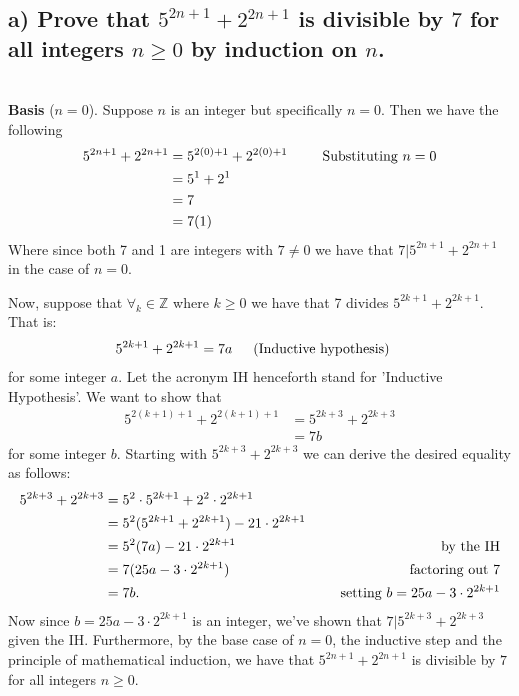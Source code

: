 \documentclass[11pt, letterpaper]{article}
\begin{document}
\subsection*{a) Prove that $5^{2n+1}+2^{2n+1}$ is divisible by $7$ for all integers $n\geq 0$ by induction on $n$.}
\begin{prf}[by induction]~\\
    {\bf Basis} ($n=0$). Suppose $n$ is an integer but specifically $n=0$. Then we have the following
    \begin{align*}
        5^{2n+1}+2^{2n+1} &= 5^{2(0)+1}+2^{2(0)+1} &\text{\indent Substituting $n=0$} \\
        &=5^1+2^1 \\
        &=7 \\
        &=7(1)
    \end{align*}
    Where since both 7 and 1 are integers with $7\neq 0$ we have that $7|5^{2n+1}+2^{2n+1}$ in the case of $n=0$.

     Now, suppose that $\forall_{k} \in \mathbb{Z}$ where $k \geq 0$ we have that 7 divides $5^{2k+1}+2^{2k+1}$. That is:
    \begin{align*}
        5^{2k+1}+2^{2k+1} &= 7a \text{\indent (Inductive hypothesis)}
    \end{align*}
    for some integer $a$. Let the acronym IH henceforth stand for 'Inductive Hypothesis'. We want to show that
    \begin{align*}
        5^{2(k+1)+1}+2^{2(k+1)+1} &= 5^{2k+3}+2^{2k+3} \\
        &= 7b
    \end{align*}
    for some integer $b$. Starting with $5^{2k+3}+2^{2k+3}$ we can derive the desired equality as follows:
    \begin{align*}
        5^{2k+3}+2^{2k+3} &= 5^2\cdot 5^{2k+1}+2^2\cdot 2^{2k+1} \\
        &= 5^2(5^{2k+1}+2^{2k+1}) -21\cdot 2^{2k+1}\\
        &= 5^2(7a)-21\cdot 2^{2k+1} &\text{\indent by the IH}\\
        &= 7(25a - 3\cdot 2^{2k+1}) &\text{\indent factoring out 7}\\
        &= 7b. &\text{\indent setting $b=25a - 3\cdot 2^{2k+1}$}
    \end{align*}
    Now since $b=25a - 3\cdot 2^{2k+1}$ is an integer, we've shown that $7| 5^{2k+3}+2^{2k+3}$ given the IH. 
    Furthermore, by the base case of $n=0$, the inductive step and the principle of mathematical induction, we have that
    $5^{2n+1}+2^{2n+1}$ is divisible by $7$ for all integers $n\geq 0$.
\end{prf}
\end{document}
